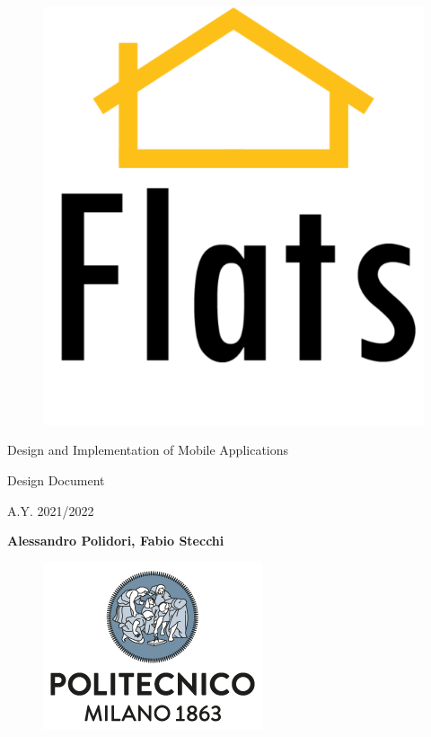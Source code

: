 \documentclass[a4paper, 11pt, parskip=half]{scrreprt}
\begin{document}
\begin{titlepage}
    \begin{center}
        
        \begin{figure}[t]
            \centering
            \includegraphics[scale=1.4]{images/logo.png}
        \end{figure}
        
        \vspace{0.1cm}
        \Large
        Design and Implementation of Mobile Applications
        
        \vspace{0.1cm}
        \Large
        Design Document
        
        \vspace{0.5cm}
        \LARGE 
        A.Y. 2021/2022
        \vspace{1cm}
            
        \textbf{Alessandro Polidori, Fabio Stecchi}
            
        \vfill
            
        \begin{figure}[b]
            \centering
            \includegraphics[scale=0.6]{images/POLIlogo.png}
        \end{figure} 
        
    \end{center}
\end{titlepage}
\end{document}
